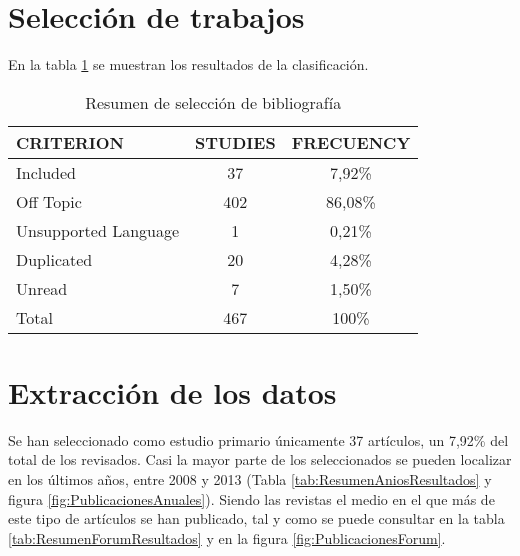 \section{Selección de trabajos}
En la tabla \ref{tab:ResumenSelecccionResultados} se muestran los resultados de la clasificación.

\begin{table}[H]
  \begin{center}
  \begin{tabular}{| m{4cm} | c | c |}
    \hline
    CRITERION & STUDIES & FRECUENCY\\
    \hline
    \hline 
    Included & 37 & 7,92\% \\
    \hline
    Off Topic & 402 & 86,08\% \\
    \hline
    Unsupported Language & 1 & 0,21\% \\
    \hline
    Duplicated & 20 & 4,28\% \\
    \hline
    Unread & 7 & 1,50\% \\
    \hline
    Total & 467 & 100\% \\
    \hline
  \end{tabular}
\end{center}
\caption{Resumen de selección de bibliografía}
\label{tab:ResumenSelecccionResultados}
\end{table} 


\section{Extracción de los datos}
Se han seleccionado como estudio primario únicamente 37 artículos, un 7,92\% del total de los revisados. Casi la mayor parte de los seleccionados se pueden localizar en los últimos años, entre 2008 y 2013 (Tabla \ref{tab:ResumenAniosResultados} y figura \ref{fig:PublicacionesAnuales}). Siendo las revistas el medio en el que más de este tipo de artículos se han publicado, tal y como se puede consultar en la tabla \ref{tab:ResumenForumResultados} y en la figura \ref{fig:PublicacionesForum}.


